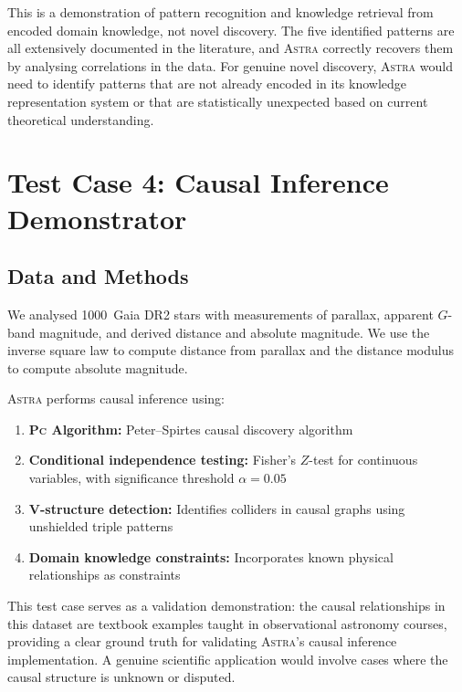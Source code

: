 \documentclass[fleqn,usenatbib]{mnras}
\newcommand{\astra}{\textsc{Astra}\xspace}
\newcommand{\pc}{\textsc{Pc}\xspace}
\begin{document}
This is a demonstration of pattern recognition and knowledge retrieval from encoded domain knowledge, not novel discovery.
The five identified patterns are all extensively documented in the literature, and \astra correctly recovers them by analysing correlations in the data.
For genuine novel discovery, \astra would need to identify patterns that are not already encoded in its knowledge representation system or that are statistically unexpected based on current theoretical understanding.

\section{Test Case 4: Causal Inference Demonstrator}
\label{sec:tc4}

\subsection{Data and Methods}
\label{sec:tc4:data}

We analysed 1000~Gaia DR2 stars \citep{GaiaCollaboration2018} with measurements of parallax, apparent $G$-band magnitude, and derived distance and absolute magnitude.
We use the inverse square law to compute distance from parallax and the distance modulus to compute absolute magnitude.

\astra performs causal inference using:
\begin{enumerate}
  \item[(i)] \textbf{\pc Algorithm:} Peter--Spirtes causal discovery algorithm \citep{Spirtes2000}
  \item[(ii)] \textbf{Conditional independence testing:} Fisher's $Z$-test for continuous variables, with significance threshold $\alpha = 0.05$
  \item[(iii)] \textbf{V-structure detection:} Identifies colliders in causal graphs using unshielded triple patterns
  \item[(iv)] \textbf{Domain knowledge constraints:} Incorporates known physical relationships as constraints
\end{enumerate}

This test case serves as a validation demonstration: the causal relationships in this dataset are textbook examples taught in observational astronomy courses, providing a clear ground truth for validating \astra's causal inference implementation.
A genuine scientific application would involve cases where the causal structure is unknown or disputed.
\end{document}
